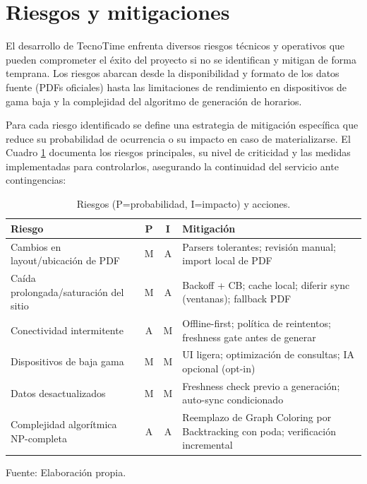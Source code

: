 \section{Riesgos y mitigaciones}
El desarrollo de TecnoTime enfrenta diversos riesgos técnicos y operativos que pueden comprometer el éxito del proyecto si no se identifican y mitigan de forma temprana. Los riesgos abarcan desde la disponibilidad y formato de los datos fuente (PDFs oficiales) hasta las limitaciones de rendimiento en dispositivos de gama baja y la complejidad del algoritmo de generación de horarios.

Para cada riesgo identificado se define una estrategia de mitigación específica que reduce su probabilidad de ocurrencia o su impacto en caso de materializarse. El Cuadro \ref{tab:riesgos} documenta los riesgos principales, su nivel de criticidad y las medidas implementadas para controlarlos, asegurando la continuidad del servicio ante contingencias:

\begin{table}[H]
\centering
\begin{tabularx}{\linewidth}{p{6.6cm} c c p{7.8cm}}
\toprule
Riesgo & P & I & Mitigación \\
\midrule
Cambios en layout/ubicación de PDF & M & A & Parsers tolerantes; revisión manual; import local de PDF \\
Caída prolongada/saturación del sitio & M & A & Backoff + CB; cache local; diferir sync (ventanas); fallback PDF \\
Conectividad intermitente & A & M & Offline-first; política de reintentos; freshness gate antes de generar \\
Dispositivos de baja gama & M & M & UI ligera; optimización de consultas; IA opcional (opt-in) \\
Datos desactualizados & M & M & Freshness check previo a generación; auto-sync condicionado \\
Complejidad algorítmica NP-completa & A & A & Reemplazo de Graph Coloring por Backtracking con poda; verificación incremental \\
\bottomrule
\end{tabularx}
\caption{Riesgos (P=probabilidad, I=impacto) y acciones.}\label{tab:riesgos}
Fuente: Elaboración propia.
\end{table}
